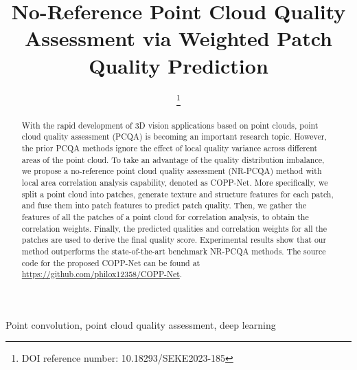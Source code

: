 \documentclass[conference]{IEEEtran}
\begin{document}
\title{No-Reference Point Cloud Quality Assessment via Weighted Patch Quality Prediction\\
}





\author{

\and
{}


\and
{}
\thanks{DOI reference number: 10.18293/SEKE2023-185}
}

\maketitle


\begin{abstract}
With the rapid development of 3D vision applications based on point clouds, point cloud quality assessment (PCQA) is becoming an important research topic. However, the prior PCQA methods ignore the effect of local quality variance across different areas of the point cloud. To take an advantage of the quality distribution imbalance, we propose a no-reference point cloud quality assessment (NR-PCQA) method with local area correlation analysis capability, denoted as COPP-Net. More specifically, we split a point cloud into patches, generate texture and structure features for each patch, and fuse them into patch features to predict patch quality. Then, we gather the features of all the patches of a point cloud for correlation analysis, to obtain the correlation weights. Finally, the predicted qualities and correlation weights for all the patches are used to derive the final quality score. Experimental results show that our method outperforms the state-of-the-art benchmark NR-PCQA methods. The source code for the proposed COPP-Net can be found at \href{https://github.com/philox12358/COPP-Net}{https://github.com/philox12358/COPP-Net}.

\end{abstract}

\begin{IEEEkeywords}
Point convolution, point cloud quality assessment, deep learning
\end{IEEEkeywords}
\end{document}
